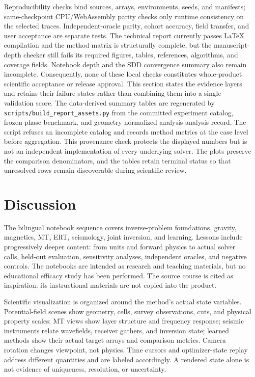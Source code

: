 Reproducibility checks bind sources, arrays, environments, seeds, and
manifests; same-checkpoint CPU/WebAssembly parity checks only runtime
consistency on the selected traces. Independent-oracle parity, cohort
accuracy, field transfer, and user acceptance are separate tests. The
technical report currently passes LaTeX compilation and the method
matrix is structurally complete, but the manuscript-depth checker still
fails its required figures, tables, references, algorithms, and
coverage fields. Notebook depth and the SDD convergence summary also
remain incomplete. Consequently, none of these local checks constitutes
whole-product scientific acceptance or release approval. This section
states the evidence layers and retains their failure states rather than
combining them into a single validation score.
The data-derived summary tables are regenerated by
\texttt{scripts/build\_report\_assets.py} from the committed experiment
catalog, frozen phase benchmark, and geometry-normalized analysis
analysis record. The script refuses an incomplete catalog and records method
metrics at the case level before aggregation. This provenance check
protects the displayed numbers but is not an independent implementation
of every underlying solver. The plots preserve the comparison
denominators, and the tables retain terminal status so that unresolved
rows remain discoverable during scientific review.

\section{Discussion}\label{discussion}

The bilingual notebook sequence covers inverse-problem foundations,
gravity, magnetics, MT, ERT, seismology, joint inversion, and learning.
Lessons include progressively deeper content: from units and forward
physics to actual solver calls, held-out evaluation, sensitivity
analyses, independent oracles, and negative controls. The notebooks are
intended as research and teaching materials, but no educational efficacy
study has been performed. The source course is cited as inspiration; its
instructional materials are not copied into the product.

Scientific visualization is organized around the method's actual state
variables. Potential-field scenes show geometry, cells, survey
observations, cuts, and physical property scales; MT views show layer
structure and frequency response; seismic instruments relate wavefields,
receiver gathers, and inversion state; learned methods show their actual
target arrays and comparison metrics. Camera rotation changes viewpoint,
not physics. Time cursors and optimizer-state replay address different
quantities and are labeled accordingly. A rendered state alone is not
evidence of uniqueness, resolution, or uncertainty.


